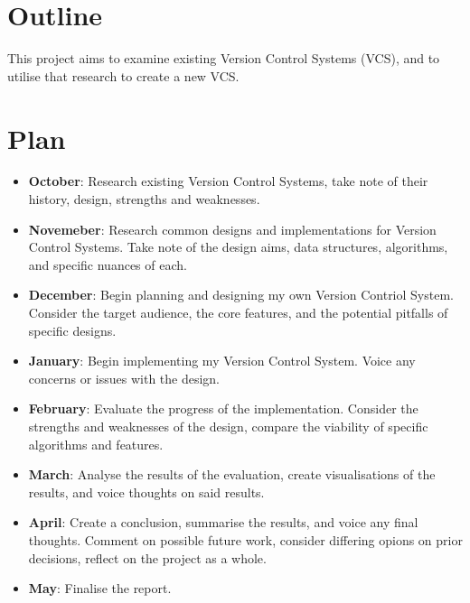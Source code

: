 \documentclass[a4paper,12pt]{article}
\title{}
\author{Reece Donovan}
\begin{document}
\pagestyle{empty}
\section*{Outline}
This project aims to examine existing Version Control Systems (VCS), and to utilise that research to create a new VCS.
\section*{Plan}
\begin{itemize}
    \item \textbf{October}: Research existing Version Control Systems, take note of their history, design, strengths and weaknesses.
    \item \textbf{Novemeber}: Research common designs and implementations for Version Control Systems. Take note of the design aims, data structures, algorithms, and specific nuances of each.
    \item \textbf{December}: Begin planning and designing my own Version Contriol System. Consider the target audience, the core features, and the potential pitfalls of specific designs.
    \item \textbf{January}: Begin implementing my Version Control System. Voice any concerns or issues with the design.
    \item \textbf{February}: Evaluate the progress of the implementation. Consider the strengths and weaknesses of the design, compare the viability of specific algorithms and features.
    \item \textbf{March}: Analyse the results of the evaluation, create visualisations of the results, and voice thoughts on said results.
    \item \textbf{April}: Create a conclusion, summarise the results, and voice any final thoughts. Comment on possible future work, consider differing opions on prior decisions, reflect on the project as a whole.
    \item \textbf{May}: Finalise the report.
\end{itemize}
\end{document}
